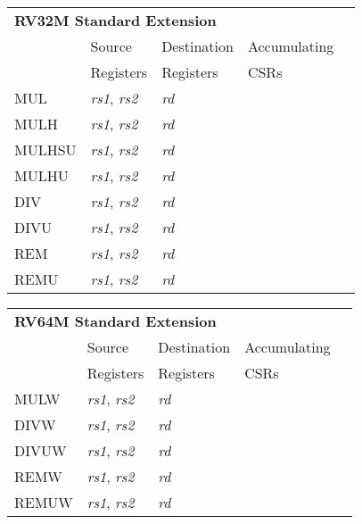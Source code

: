 \begin{tabular}{p{3cm}|p{3cm}|p{2cm}|p{4cm}|p{4cm}}
  \multicolumn{4}{l}{\bf RV32M Standard Extension} \\
  \cline{2-4}
   & Source    & Destination & Accumulating \\
   & Registers & Registers   & CSRs \\
  \cline{2-4}
   MUL & {\em rs1}, {\em rs2} & {\em rd} &   & \\
   \cline{2-4}
   MULH & {\em rs1}, {\em rs2} & {\em rd} &   & \\
   \cline{2-4}
   MULHSU & {\em rs1}, {\em rs2} & {\em rd} &   & \\
   \cline{2-4}
   MULHU & {\em rs1}, {\em rs2} & {\em rd} &   & \\
   \cline{2-4}
   DIV & {\em rs1}, {\em rs2} & {\em rd} &   & \\
   \cline{2-4}
   DIVU & {\em rs1}, {\em rs2} & {\em rd} &   & \\
   \cline{2-4}
   REM & {\em rs1}, {\em rs2} & {\em rd} &   & \\
   \cline{2-4}
   REMU & {\em rs1}, {\em rs2} & {\em rd} &   & \\
   \cline{2-4}
\end{tabular}

\begin{tabular}{p{3cm}|p{3cm}|p{2cm}|p{4cm}|p{4cm}}
  \multicolumn{4}{l}{\bf RV64M Standard Extension} \\
  \cline{2-4}
   & Source    & Destination & Accumulating \\
   & Registers & Registers   & CSRs \\
  \cline{2-4}
   MULW & {\em rs1}, {\em rs2} & {\em rd} &   & \\
   \cline{2-4}
   DIVW & {\em rs1}, {\em rs2} & {\em rd} &   & \\
   \cline{2-4}
   DIVUW & {\em rs1}, {\em rs2} & {\em rd} &   & \\
   \cline{2-4}
   REMW & {\em rs1}, {\em rs2} & {\em rd} &   & \\
   \cline{2-4}
   REMUW & {\em rs1}, {\em rs2} & {\em rd} &   & \\
   \cline{2-4}
\end{tabular}

